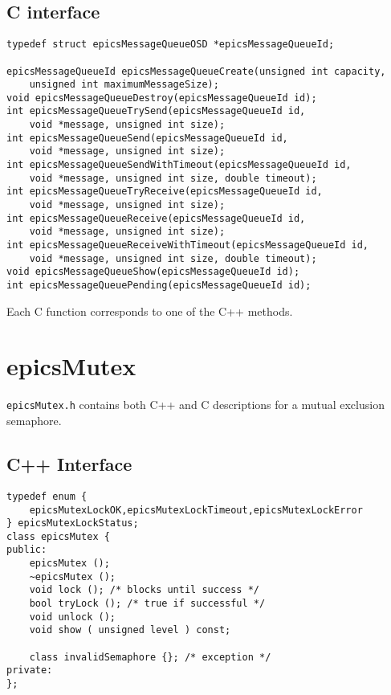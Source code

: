 \subsection{C interface}

\begin{verbatim}
typedef struct epicsMessageQueueOSD *epicsMessageQueueId;

epicsMessageQueueId epicsMessageQueueCreate(unsigned int capacity,
    unsigned int maximumMessageSize);
void epicsMessageQueueDestroy(epicsMessageQueueId id);
int epicsMessageQueueTrySend(epicsMessageQueueId id,
    void *message, unsigned int size);
int epicsMessageQueueSend(epicsMessageQueueId id,
    void *message, unsigned int size);
int epicsMessageQueueSendWithTimeout(epicsMessageQueueId id,
    void *message, unsigned int size, double timeout);
int epicsMessageQueueTryReceive(epicsMessageQueueId id,
    void *message, unsigned int size);
int epicsMessageQueueReceive(epicsMessageQueueId id,
    void *message, unsigned int size);
int epicsMessageQueueReceiveWithTimeout(epicsMessageQueueId id,
    void *message, unsigned int size, double timeout);
void epicsMessageQueueShow(epicsMessageQueueId id);
int epicsMessageQueuePending(epicsMessageQueueId id);
\end{verbatim}

Each C function corresponds to one of the C++ methods.

\section{epicsMutex}

\verb|epicsMutex.h| contains both C++ and C descriptions for a mutual exclusion semaphore.

\subsection{C++ Interface}

\begin{verbatim}
typedef enum {
    epicsMutexLockOK,epicsMutexLockTimeout,epicsMutexLockError
} epicsMutexLockStatus;
class epicsMutex {
public:
    epicsMutex ();
    ~epicsMutex ();
    void lock (); /* blocks until success */
    bool tryLock (); /* true if successful */
    void unlock ();
    void show ( unsigned level ) const;

    class invalidSemaphore {}; /* exception */
private:
};
\end{verbatim}

